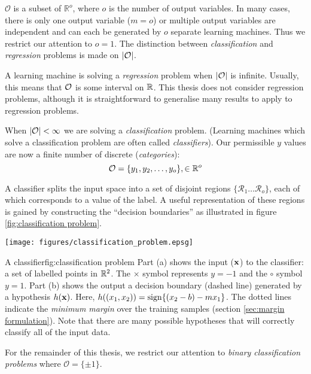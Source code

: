 $\mathcal{O}$ is a subset of $\mathbb{R}^o$, where $o$ is the number
of output variables.  In many cases, there is only one output
variable ($m=o$) or multiple output variables are independent and
can each be generated by $o$ separate learning machines.
Thus we restrict our attention to $o=1$.  The distinction between
\emph{classification} and \emph{regression} problems is made on
$|\mathcal{O}|$.

A learning machine is solving a \emph{regression} problem when
$|\mathcal{O}|$ is infinite.  Usually, this means that $\mathcal{O}$ is some
interval on $\mathbb{R}$.  This thesis does not consider regression
problems, although it is straightforward to generalise many results to
apply to regression problems. 

When $|\mathcal{O}| < \infty$ we are solving a \emph{classification}
problem.  (Learning machines which solve a classification problem are
often called \emph{classifiers}).  Our permissible $y$ values are now
a finite number of discrete (\emph{categories}):
%
\begin{equation}
\mathcal{O} = \{y_1, y_2, \ldots, y_o\}, \in \mathbb{R}^o
\end{equation}

A classifier splits the input space into a set of disjoint regions 
$\{ \mathcal{R}_1 \ldots \mathcal{R}_o \}$, each of which corresponds
to a value of the label.  A useful representation of these regions is 
gained by constructing the ``decision boundaries'' as illustrated in
figure \ref{fig:classification problem}. 

\begin{linefigure}
\begin{center}
\texttt{[image: figures/classification\_problem.epsg]}
\end{center}
\begin{capt}{A classifier}{fig:classification problem}
Part (a) shows the input ($\mathbf{x}$) to the classifier: a set of
labelled points in $\mathbb{R}^2$.  The $\times$ symbol represents $y=-1$
and the $\circ$ symbol $y=1$.  Part (b) shows the output a decision
boundary (dashed line) generated by a hypothesis $h(\mathbf{x})$.  Here,
$h((x_1, x_2)) = \mathrm{sign}\{ (x_2 - b) - m x_1 \}$.  The dotted lines
indicate the \emph{minimum margin} over the training samples (section
\ref{sec:margin formulation}).  Note that there are many possible
hypotheses that will correctly classify all of the input data.
\end{capt}
\end{linefigure}

For the remainder of this thesis, we restrict our attention to
\emph{binary classification problems} where $\mathcal{O} = \{\pm
1\}$.


